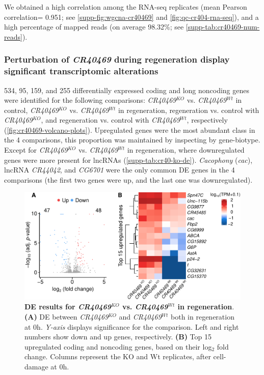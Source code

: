 We obtained a high correlation among the RNA-seq replicates (mean Pearson correlation= 0.951; see \autoref{supp-fig:wgcna-cr40469} and \autoref{fig:qc-cr404-rna-seq}), and a high percentage of mapped reads (on average 98.32\%; see \autoref{supp-tab:cr40469-num-reads}). 

\subsubsection{Perturbation of \textit{CR40469} during regeneration display significant transcriptomic alterations}
\label{sub-sub-sec:cr40469-de-results}

534, 95, 159, and 255 differentially expressed coding and long noncoding genes were identified for the following comparisons: \textit{CR40469}$^{KO}$ vs. \textit{CR40469}$^{Wt}$ in control, \textit{CR40469}$^{KO}$ vs. \textit{CR40469}$^{Wt}$ in regeneration, regeneration vs. control with \textit{CR40469}$^{KO}$, and regeneration vs. control with \textit{CR40469}$^{Wt}$, respectively (\autoref{fig:cr40469-volcano-plots}). Upregulated genes were the most abundant class in the 4 comparisons, this proportion was maintained by inspecting by gene-biotype. Except for \textit{CR40469}$^{KO}$ vs. \textit{CR40469}$^{Wt}$ in regeneration, where downregulated genes were more present for lncRNAs (\autoref{supp-tab:cr40-ko-de}). \textit{Cacophony} (\textit{cac}), lncRNA \textit{CR44042}, and \textit{CG6701} were the only common DE genes in the 4 comparisons (the first two genes were up, and the last one was downregulated). 

\begin{figure}[ht!]
  \centering
  \includegraphics[scale=0.65]{plots/results/dme/condition.2.volcano.heatmap.pdf}
    \caption[DE results for \textit{CR40469}-KO vs. \textit{CR40469}-Wt in regeneration]{\textbf{DE results for \textit{CR40469}$^{KO}$ vs. \textit{CR40469}$^{Wt}$ in regeneration}. \textbf{(A)} DE between \textit{CR40469}$^{KO}$ and \textit{CR40469}$^{Wt}$ both in regeneration at 0h. \textit{Y-axis} displays significance for the comparison. Left and right numbers show down and up genes, respectively. \textbf{(B)} Top 15 upregulated coding and noncoding genes, based on their log$_2$ fold change. Columns represent the KO and Wt replicates, after cell-damage at 0h.}
  \label{fig:cr40469-de-volcano-2}
\end{figure}

